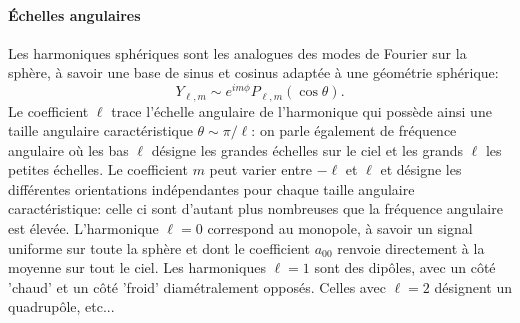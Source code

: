 \paragraph{Échelles angulaires}
 Les harmoniques sphériques sont les analogues des modes de Fourier sur la sphère, à savoir une base de sinus et cosinus adaptée à une géométrie sphérique:
\begin{equation}
Y_{\ell,m}\sim e^{im\phi} P_{\ell,m}(\cos \theta).
\end{equation} 
 Le coefficient $\ell$ trace l'échelle angulaire de l'harmonique qui possède ainsi une taille angulaire caractéristique $\theta\sim\pi/\ell$: on parle également de fréquence angulaire où les bas $\ell$ désigne les grandes échelles sur le ciel et les grands $\ell$ les petites échelles. Le coefficient $m$ peut varier entre $-\ell$ et $\ell$ et désigne les différentes orientations indépendantes pour chaque taille angulaire caractéristique: celle ci sont d'autant plus nombreuses que la fréquence angulaire est élevée. L'harmonique $\ell=0$ correspond au monopole, à savoir un signal uniforme sur toute la sphère et dont le coefficient $a_{00}$ renvoie directement à la moyenne sur tout le ciel. Les harmoniques $\ell=1$ sont des dipôles, avec un côté 'chaud' et un côté 'froid' diamétralement opposés. Celles avec $\ell=2$ désignent un quadrupôle, etc...

